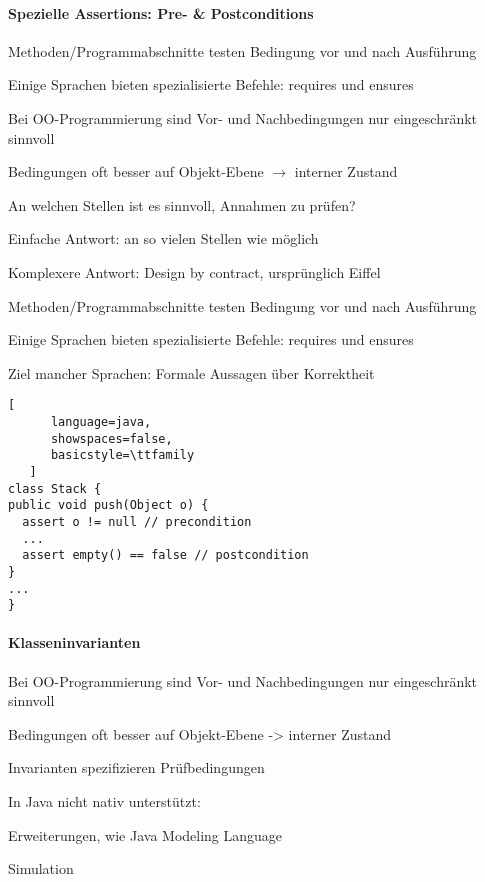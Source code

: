 \documentclass[10pt]{article}
\begin{document}
\begin{itemize*}
\paragraph{Spezielle Assertions: Pre- \& Postconditions}
\begin{itemize*}
  \item Methoden/Programmabschnitte testen Bedingung vor und nach Ausführung
  \item Einige Sprachen bieten spezialisierte Befehle: requires und ensures
  \item Bei OO-Programmierung sind Vor- und Nachbedingungen nur eingeschränkt sinnvoll
  \begin{itemize*}
    \item Bedingungen oft besser auf Objekt-Ebene $\rightarrow$ interner Zustand
  \end{itemize*}
  \item An welchen Stellen ist es sinnvoll, Annahmen zu prüfen?
  \item Einfache Antwort: an so vielen Stellen wie möglich
  \item Komplexere Antwort: Design by contract, ursprünglich Eiffel
  \item Methoden/Programmabschnitte testen Bedingung vor und nach Ausführung
  \item Einige Sprachen bieten spezialisierte Befehle: requires und ensures
  \item Ziel mancher Sprachen: Formale Aussagen über Korrektheit
\end{itemize*}

\begin{lstlisting}[
      language=java,
      showspaces=false,
      basicstyle=\ttfamily
   ]
class Stack {
public void push(Object o) {
  assert o != null // precondition
  ...
  assert empty() == false // postcondition
}
...
}
\end{lstlisting}

\paragraph{Klasseninvarianten}
\begin{itemize*}
  \item Bei OO-Programmierung sind Vor- und Nachbedingungen nur eingeschränkt sinnvoll
  \item Bedingungen oft besser auf Objekt-Ebene -> interner Zustand
  \item Invarianten spezifizieren Prüfbedingungen
  \item In Java nicht nativ unterstützt:
  \begin{itemize*}
    \item Erweiterungen, wie Java Modeling Language
    \item Simulation
  \end{itemize*}
\end{itemize*}


\end{itemize*}
\end{document}
